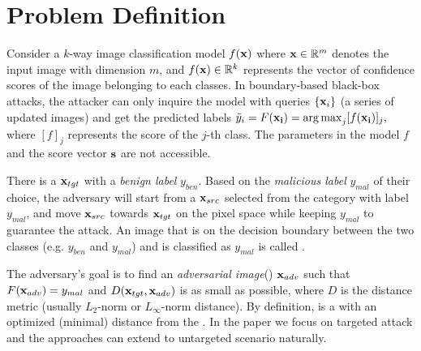 

\section{Problem Definition}
Consider a $k$-way image classification model $f({\bf x})$ where ${\bf x}\in\mathbb{R}^m$ denotes the input image with dimension $m$, and $f({\bf x})\in\mathbb{R}^k$ represents the vector of confidence scores of the image belonging to each classes. 
In boundary-based black-box attacks, the attacker can only inquire the model with queries $\{ {\bf x}_i \}$ (a series of updated images) and get the predicted labels %
$\tilde{y}_i=F({\bf x_i}) = \operatorname*{arg\,max}_j [f({\bf x_i})]_j,$
where $[f]_j$ represents the score of the $j$-th class. The parameters in the model $f$ and the score vector $\bf s$ are not accessible.

There is a \targetimage ${\bf x}_{tgt}$ with a \emph{benign label} $y_{ben}$. Based on the \emph{malicious label} $y_{mal}$ of their choice, the adversary will start from a \sourceimage ${\bf x}_{src}$ selected from the category with label $y_{mal}$, and move ${\bf x}_{src}$ towards ${\bf x}_{tgt}$ on the pixel space while keeping $y_{mal}$ to guarantee the attack. 
An image that is on the decision boundary between the two classes (e.g. $y_{ben}$ and $y_{mal}$) and is classified as $y_{mal}$ is called \boundaryimage. 

The adversary's goal is to find an \emph{adversarial image}(\advimage) ${\bf x}_{adv}$ such that $F({\bf x}_{adv}) = y_{mal}$ and $D({\bf x}_{tgt}, {\bf x}_{adv})$ is as small as possible, where $D$ is the distance metric (usually $L_2$-norm or $L_\infty$-norm distance). By definition, \advimage is a \boundaryimage with an optimized (minimal) distance from the \targetimage. 
In the paper we focus on targeted attack and the approaches can extend to untargeted scenario naturally. 







